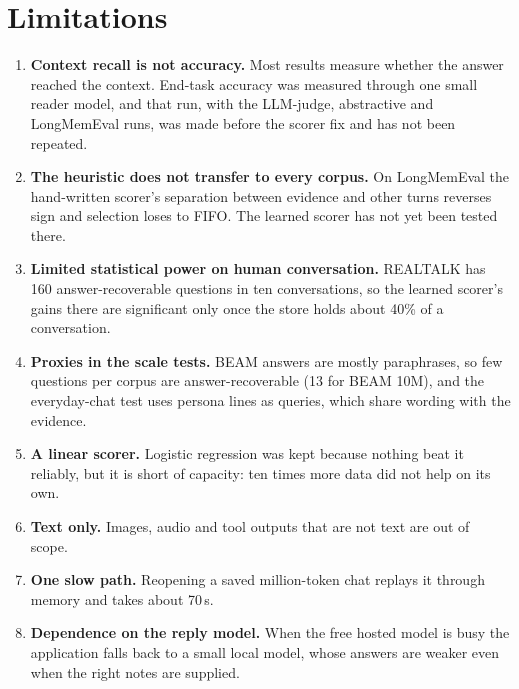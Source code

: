 \section{Limitations}
\begin{enumerate}
\item \textbf{Context recall is not accuracy.} Most results measure whether
  the answer reached the context. End-task accuracy was measured through one
  small reader model, and that run, with the LLM-judge, abstractive and
  LongMemEval runs, was made before the scorer fix and has not been repeated.
\item \textbf{The heuristic does not transfer to every corpus.} On
  LongMemEval the hand-written scorer's separation between evidence and other
  turns reverses sign and selection loses to FIFO. The learned scorer has not
  yet been tested there.
\item \textbf{Limited statistical power on human conversation.} REALTALK has
  160 answer-recoverable questions in ten conversations, so the learned
  scorer's gains there are significant only once the store holds about 40\%
  of a conversation.
\item \textbf{Proxies in the scale tests.} BEAM answers are mostly
  paraphrases, so few questions per corpus are answer-recoverable (13 for
  BEAM 10M), and the everyday-chat test uses persona lines as queries, which
  share wording with the evidence.
\item \textbf{A linear scorer.} Logistic regression was kept because nothing
  beat it reliably, but it is short of capacity: ten times more data did not
  help on its own.
\item \textbf{Text only.} Images, audio and tool outputs that are not text
  are out of scope.
\item \textbf{One slow path.} Reopening a saved million-token chat replays it
  through memory and takes about 70\,s.
\item \textbf{Dependence on the reply model.} When the free hosted model is
  busy the application falls back to a small local model, whose answers are
  weaker even when the right notes are supplied.
\end{enumerate}

